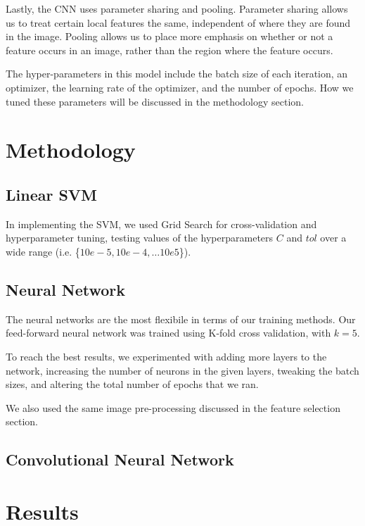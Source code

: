 \documentclass[conference]{IEEEtran}
\begin{document}
Lastly, the CNN uses parameter sharing and pooling. Parameter sharing allows us to treat certain local features the same, independent of where they are found in the image. Pooling allows us to place more emphasis on whether or not a feature occurs in an image, rather than the region where the feature occurs.

The hyper-parameters in this model include the batch size of each iteration, an optimizer, the learning rate of the optimizer, and the number of epochs. How we tuned these parameters will be discussed in the methodology section.

\section{\textbf{Methodology}}

\subsection{Linear SVM}

In implementing the SVM, we used Grid Search for cross-validation and hyperparameter tuning, testing values of the hyperparameters $C$ and $tol$ over a wide range (i.e. \{$10e-5, 10e-4, \ldots 10e5$\}).

\subsection{Neural Network}

The neural networks are the most flexibile in terms of our training methods. Our feed-forward neural network was trained using K-fold cross validation, with $k = 5$.

To reach the best results, we experimented with adding more layers to the network, increasing the number of neurons in the given layers, tweaking the batch sizes, and altering the total number of epochs that we ran.

We also used the same image pre-processing discussed in the feature selection section.

\subsection{Convolutional Neural Network}


\section{\textbf{Results}}
\end{document}
